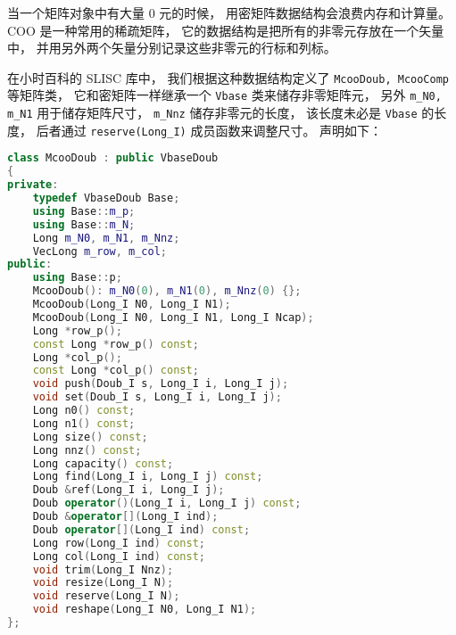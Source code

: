 
\begin{issues}
\issueDraft
\end{issues}


当一个矩阵对象中有大量 0 元的时候， 用密矩阵数据结构会浪费内存和计算量。 COO 是一种常用的稀疏矩阵， 它的数据结构是把所有的非零元存放在一个矢量中， 并用另外两个矢量分别记录这些非零元的行标和列标。

在小时百科的 SLISC 库中， 我们根据这种数据结构定义了 \verb`McooDoub, McooComp` 等矩阵类， 它和密矩阵一样继承一个 \verb`Vbase` 类来储存非零矩阵元， 另外 \verb`m_N0, m_N1` 用于储存矩阵尺寸， \verb`m_Nnz` 储存非零元的长度， 该长度未必是 \verb`Vbase` 的长度， 后者通过 \verb`reserve(Long_I)` 成员函数来调整尺寸。 声明如下：
\begin{lstlisting}[language=cpp]
class McooDoub : public VbaseDoub
{
private:
    typedef VbaseDoub Base;
    using Base::m_p;
    using Base::m_N;
    Long m_N0, m_N1, m_Nnz;
    VecLong m_row, m_col;
public:
    using Base::p;
    McooDoub(): m_N0(0), m_N1(0), m_Nnz(0) {};
    McooDoub(Long_I N0, Long_I N1);
    McooDoub(Long_I N0, Long_I N1, Long_I Ncap);
    Long *row_p();
    const Long *row_p() const;
    Long *col_p();
    const Long *col_p() const;
    void push(Doub_I s, Long_I i, Long_I j);
    void set(Doub_I s, Long_I i, Long_I j);
    Long n0() const;
    Long n1() const;
    Long size() const;
    Long nnz() const;
    Long capacity() const;
    Long find(Long_I i, Long_I j) const;
    Doub &ref(Long_I i, Long_I j);
    Doub operator()(Long_I i, Long_I j) const;
    Doub &operator[](Long_I ind);
    Doub operator[](Long_I ind) const;
    Long row(Long_I ind) const;
    Long col(Long_I ind) const;
    void trim(Long_I Nnz);
    void resize(Long_I N);
    void reserve(Long_I N);
    void reshape(Long_I N0, Long_I N1);
};
\end{lstlisting}
